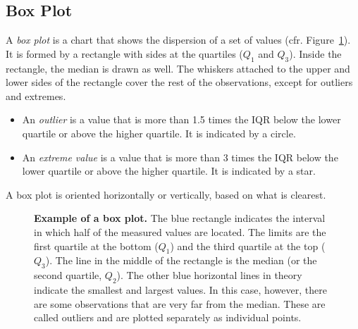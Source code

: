 \subsection{Box Plot}

A \emph{box plot} is a chart that shows the dispersion of a set of values (cfr. Figure~\ref{fig:boxplot}). It is formed by a rectangle with sides at the quartiles ($Q_1$ and $Q_3$). Inside the rectangle, the median is drawn as well. The whiskers attached to the upper and lower sides of the rectangle cover the rest of the observations, except for outliers and extremes.

\begin{itemize}
    \item An \emph{outlier} is a value that is more than 1.5 times the IQR below the lower quartile or above the higher quartile. It is indicated by a circle.
    \item An \emph{extreme value} is a value that is more than 3 times the IQR below the lower quartile or above the higher quartile. It is indicated by a star.
\end{itemize}

A box plot is oriented horizontally or vertically, based on what is clearest.

\begin{figure}
    \centering
    \caption[Example of a box plot]{\textbf{Example of a box plot.} The blue rectangle indicates the interval in which half of the measured values are located. The limits are the first quartile at the bottom ($Q_1$) and the third quartile at the top ($Q_3$). The line in the middle of the rectangle is the median (or the second quartile, $Q_2$). The other blue horizontal lines in theory indicate the smallest and largest values. In this case, however, there are some observations that are very far from the median. These are called outliers and are plotted separately as individual points.}
    \label{fig:boxplot}
\end{figure}

